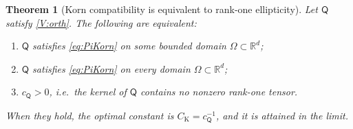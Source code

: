 \documentclass[11pt]{article}
\theoremstyle{plain}
\newtheorem{theorem}{Theorem}[section]
\theoremstyle{definition}
\theoremstyle{remark}
\newcommand{\AnyProj}{\mathsf{Q}}
\newcommand{\CK}{C_{\mathrm{K}}}
\newcommand{\cP}{c_{\AnyProj}}
\begin{document}
\begin{theorem}[Korn compatibility is equivalent to rank{-}one ellipticity]\label{thm:sharp}
Let $\AnyProj$ satisfy \cref{V:orth}. The following are equivalent:
\begin{enumerate}[label=\textup{(\roman*)},leftmargin=2.6em]
  \item\label{it:korn} $\AnyProj$ satisfies \cref{eq:PiKorn} on some bounded domain
  $\Omega\subset\mathbb{R}^d$;
  \item\label{it:allomega} $\AnyProj$ satisfies \cref{eq:PiKorn} on \emph{every} domain
  $\Omega\subset\mathbb{R}^d$;
  \item\label{it:cpi} $\cP>0$, i.e.\ the kernel of $\AnyProj$ contains no nonzero rank{-}one tensor.
\end{enumerate}
When they hold, the optimal constant is $\CK=\cP^{-1}$, and it is attained in the limit.
\end{theorem}
\end{document}
